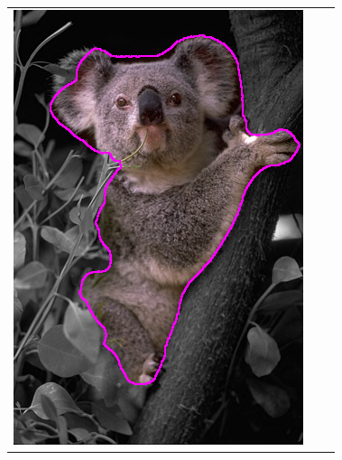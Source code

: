 \documentclass[runningheads]{llncs}
\begin{document}
\begin{figure}
\begin{tabular}{ccc}
	\includegraphics[scale=0.25]{images/segmentation/coala/r3/lg0_sq1_dt1_it50.png} \\
	

\end{tabular}
\end{figure}
\end{document}
